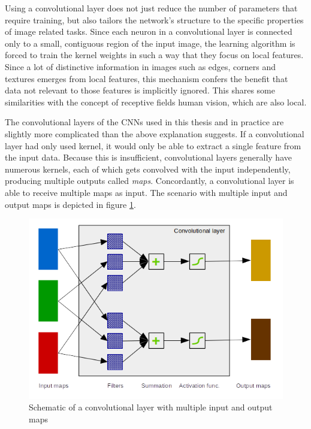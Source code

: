 \documentclass[11pt, a4paper]{article}
\begin{document}
Using a convolutional layer does not just reduce the number of parameters that require training, but also tailors the network's structure to the specific properties of image related tasks. Since each neuron in a convolutional layer is connected only to a small, contiguous region of the input image, the learning algorithm is forced to train the kernel weights in such a way that they focus on local features. Since a lot of distinctive information in images such as edges, corners and textures emerges from local features, this mechanism confers the benefit that data not relevant to those features is implicitly ignored. This shares some similarities with the concept of receptive fields human vision, which are also local.

The convolutional layers of the CNNs used in this thesis and in practice are slightly more complicated than the above explanation suggests. If a convolutional layer had only used kernel, it would only be able to extract a single feature from the input data. Because this is insufficient, convolutional layers generally have numerous kernels, each of which gets convolved with the input independently, producing multiple outputs called \emph{maps}. Concordantly, a convolutional layer is able to receive multiple maps as input. The scenario with multiple input and output maps is depicted in figure \ref{fig:convolutional-layer-maps}.

\begin{figure}[htp]
	\centering
	\includegraphics[scale=1.00]{images/convolution_layer_maps.png}
	\caption{Schematic of a convolutional layer with multiple input and output maps}
	\label{fig:convolutional-layer-maps}
\end{figure}
\end{document}
